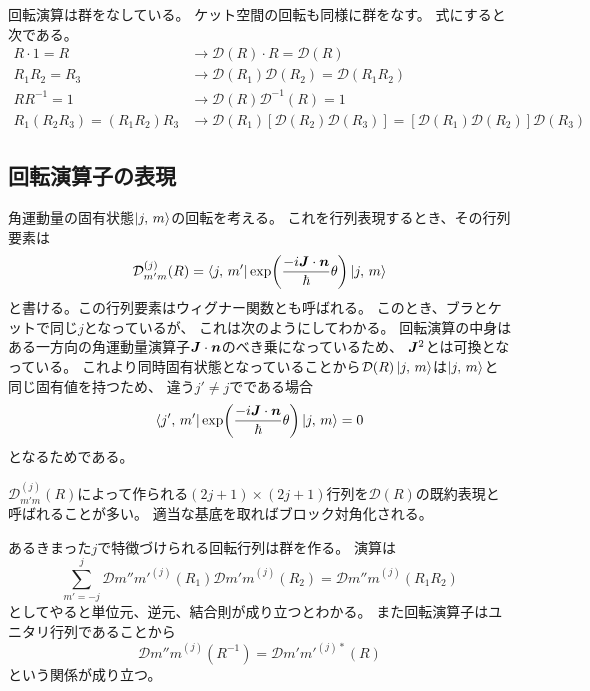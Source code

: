 \documentclass[../../master.tex]{subfiles}
\begin{document}
回転演算は群をなしている。
ケット空間の回転も同様に群をなす。
式にすると次である。
\begin{align}
    R\cdot 1 = R &\rightarrow \mathcal{D}(R) \cdot R = \mathcal{D}(R)\\
    R_1 R_2 =R_3 &\rightarrow \mathcal{D}(R_1)\mathcal{D}(R_2) = \mathcal{D}(R_1R_2)\\
    RR^{-1}=1 &\rightarrow \mathcal{D}(R)\mathcal{D}^{-1}(R)=1\\
    R_1(R_2R_3) = (R_1R_2)R_3
        &\rightarrow \mathcal{D}(R_1) [\mathcal{D}(R_2)\mathcal{D}(R_3)] = [\mathcal{D}(R_1) \mathcal{D}(R_2)]\mathcal{D}(R_3)
\end{align}

\subsection{回転演算子の表現}
角運動量の固有状態\(\ket{j,\,m}\)の回転を考える。
これを行列表現するとき、その行列要素は
\begin{equation}
    \mathcal{D}_{m'm}^{(j)}(R) = \bra{j,\,m'} \exp(\frac{-i\vb*{J}\cdot\vb*{n}}{\hbar}\theta)\ket{j,\,m}
\end{equation}
と書ける。この行列要素はウィグナー関数とも呼ばれる。
このとき、ブラとケットで同じ\(j\)となっているが、
これは次のようにしてわかる。
回転演算の中身はある一方向の角運動量演算子\(\vb*{J}\cdot\vb*{n}\)のべき乗になっているため、
\(\vb*{J}^2\)とは可換となっている。
これより同時固有状態となっていることから\(\mathcal{D}(R)\ket{j,\,m}\)は\(\ket{j,\,m}\)と同じ固有値を持つため、
違う\(j'\neq j\)でである場合
\begin{equation}
    \bra{j',\,m'} \exp(\frac{-i\vb*{J}\cdot\vb*{n}}{\hbar}\theta)\ket{j,\,m} = 0
\end{equation}
となるためである。

\(\mathcal{D}_{m'm}^{(j)}(R)\)によって作られる\((2j+1)\times(2j+1)\)行列を\(\mathcal{D}(R)\)の既約表現と呼ばれることが多い。
適当な基底を取ればブロック対角化される。

あるきまった\(j\)で特徴づけられる回転行列は群を作る。
演算は
\begin{equation}
    \sum_{m'=-j}^{j}\mathcal{D}{m''m'}^{(j)}(R_1)\mathcal{D}{m'm}^{(j)}(R_2) = \mathcal{D}{m''m}^{(j)}(R_1R_2)
\end{equation}
としてやると単位元、逆元、結合則が成り立つとわかる。
また回転演算子はユニタリ行列であることから
\begin{equation}
    \mathcal{D}{m''m}^{(j)}(R^{-1})=\mathcal{D}{m'm'}^{(j)*}(R)
\end{equation}
という関係が成り立つ。
\end{document}
